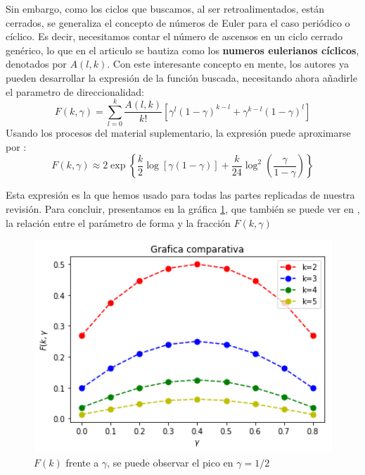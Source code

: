 \documentclass[1p]{elsarticle}
\begin{document}
 Sin embargo, como los ciclos que buscamos, al ser retroalimentados, están cerrados, se  generaliza el concepto de números de Euler para el caso periódico o cíclico. Es decir, necesitamos contar el número de ascensos en un ciclo cerrado genérico, lo que en el articulo se bautiza como los \textbf{numeros eulerianos cíclicos}, denotados por $A(l,k)$.
Con este interesante concepto en mente, los autores ya pueden desarrollar la expresión de la función buscada, necesitando ahora añadirle el parametro de direccionalidad:
$$F(k,\gamma)=\sum_{l=0}^{k}\frac{A(l,k)}{k!}[\gamma^l(1-\gamma)^{k-l}+\gamma^{k-l}(1-\gamma)^l]$$
Usando los procesos del material suplementario, la expresión puede aproximarse por :
\begin{equation}
    \label{eq:F_asymp}
    F(k,\gamma)
    \approx 
    2\exp\left\{\frac{k}{2}\log[\gamma(1-\gamma)]+\frac{k}{24} \log^2(\frac{\gamma}{1-\gamma})\right\}
\end{equation}

Esta expresión es la que hemos usado para todas las partes replicadas de nuestra revisión.
Para concluir, presentamos en la gráfica \ref{h}, que también se puede ver en \cite{arti}, la relación entre el parámetro de forma y la fracción $F(k,\gamma)$

\begin{figure}
	\centering
	\includegraphics[width=12cm]{graf_1.png}
	\caption{$F(k)$ frente a $\gamma$, se puede observar el pico en $\gamma=1/2$}
	\label{h}
\end{figure}
\end{document}
